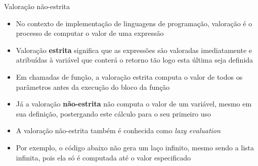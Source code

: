 \begin{frame}[fragile]{Valoração não-estrita}

    \begin{itemize}
        \item No contexto de implementação de linguagens de programação, valoração é o 
            processo de computar o valor de uma expressão

        \item Valoração \textbf{estrita} significa que as expressões são valoradas imediatamente e
            atribuídas à variável que conterá o retorno tão logo esta última seja definida

        \item Em chamadas de função, a valoração estrita computa o valor de todos os parâmetros
            antes da execução do bloco da função

        \item Já a valoração \textbf{não-estrita} não computa o valor de um variável, mesmo em
            sua definição, postergando este cálculo para o seu primeiro uso

        \item A valoração não-estrita também é conhecida como \textit{lazy evaluation}

        \item Por exemplo, o código abaixo não gera um laço infinito, mesmo sendo a lista
            infinita, pois ela só é computada até o valor especificado

    \end{itemize}

\end{frame}

